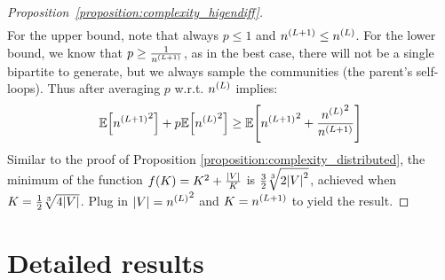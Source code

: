 \begin{proof}[Proposition~\ref{proposition:complexity_higendiff}]
\begin{align}
\end{align}
For the upper bound, note that always $p \leq 1$ and $n^{\mathopen{}\left(L+1\right)} \leq n^{\mathopen{}\left(L\right)}$. For the lower bound, we know that $p \geq \frac{1}{n^{\mathopen{}\left(L+1\right)}}$, as in the best case, there will not be a single bipartite to generate, but we always sample the communities (the parent's self-loops). Thus after averaging $p$ w.r.t. $n^{\mathopen{}\left(L\right)}$ implies: 
\begin{equation}
    \mathbb{E}\mathopen{}\left[{n^{\mathopen{}\left(L+1\right)}}^2\right] +p\mathbb{E}\mathopen{}\left[{n^{\mathopen{}\left(L\right)}}^2\right] \geq \mathbb{E}\mathopen{}\left[{n^{\mathopen{}\left(L+1\right)}}^2 + \frac{{n^{\mathopen{}\left(L\right)}}^2}{n^{\mathopen{}\left(L+1\right)}}\right]
\end{equation}
Similar to the proof of Proposition \ref{proposition:complexity_distributed}, the minimum of the function $f\mathopen{}\left(K\right)=K^2+\frac{\mathopen{}\left|V\right|}{K}$ is $\frac{3}{2}\sqrt[3]{2\mathopen{}\left|V\right|^2}$, achieved when $K=\frac{1}{2}\sqrt[3]{4\mathopen{}\left|V\right|}$. Plug in $\mathopen{}\left|V\right|={n^{\mathopen{}\left(L\right)}}^2$ and $K=n^{\mathopen{}\left(L+1\right)}$ to yield the result.
\end{proof}

\section{Detailed results}
\label{sec:appendix_higendiff_results}

